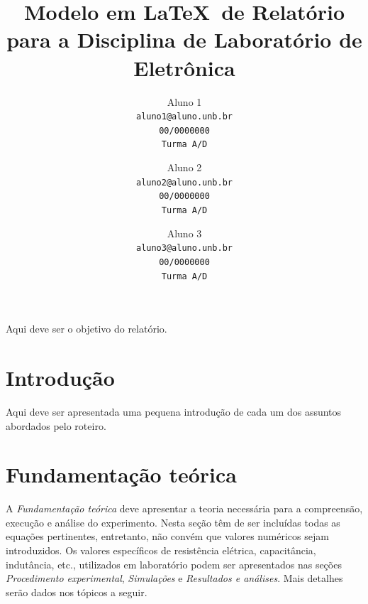 \documentclass[10pt,twocolumn,letterpaper]{article}
\begin{document}
\title{Modelo em \LaTeX\ de Relatório para a Disciplina de Laboratório de Eletrônica}

\author{Aluno 1\\
{\tt\small aluno1@aluno.unb.br}\\
{\tt\small 00/0000000}\\
{\tt\small Turma A/D}
\and
Aluno 2\\
{\tt\small aluno2@aluno.unb.br}\\
{\tt\small 00/0000000}\\
{\tt\small Turma A/D}
\and
Aluno 3\\
{\tt\small aluno3@aluno.unb.br}\\
{\tt\small 00/0000000}\\
{\tt\small Turma A/D}
}

\maketitle


\begin{objetivo}
Aqui deve ser o objetivo do relatório.

\end{objetivo}

\section{Introdução}
Aqui deve ser apresentada uma pequena introdução de cada um dos assuntos abordados pelo roteiro.

\section{Fundamentação teórica}

A {\em Fundamentação teórica} deve apresentar a teoria necessária para a compreensão, execução e análise do experimento. Nesta seção têm de ser incluídas todas as equações pertinentes, entretanto, não convém que valores numéricos sejam introduzidos. Os valores específicos de resistência elétrica, capacitância, indutância, etc., utilizados em la\-bo\-ra\-tó\-rio podem ser apresentados nas seções {\em Procedimento experimental}, {\em Simulações} e {\em Resultados e análises}. Mais detalhes serão dados nos tópicos a seguir.
\end{document}
